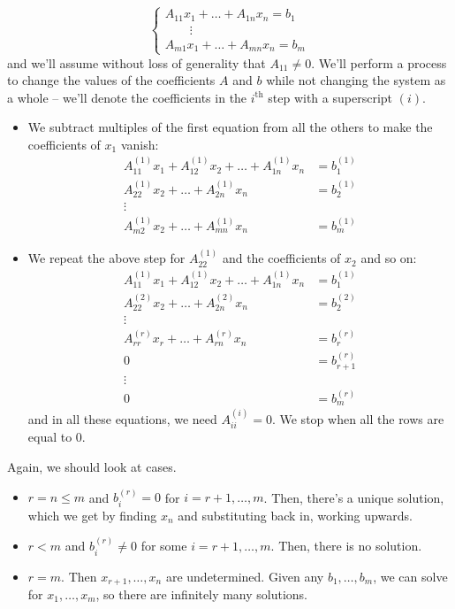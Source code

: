 \documentclass{../template/note}
\begin{document}
    \[
        \begin{cases}
            A_{11}x_1 + \dots + A_{1n}x_n = b_1 \\
            \qquad \vdots \\
            A_{m1}x_1 + \dots + A_{mn}x_n = b_m
        \end{cases}
    \]
    and we'll assume without loss of generality that \(A_{11} \neq 0\). We'll perform a process to change the values of the coefficients \(A\) and \(b\) while not changing the system as a whole -- we'll denote the coefficients in the \(i^\text{th}\) step with a superscript \((i)\).
    \begin{itemize}
        \item We subtract multiples of the first equation from all the others to make the coefficients of \(x_1\) vanish:
        \begin{align*}
            A_{11}^{(1)}x_1 + A_{12}^{(1)}x_2 + \dots + A_{1n}^{(1)}x_n &= b_1^{(1)} \\
            A_{22}^{(1)}x_2 + \dots + A_{2n}^{(1)}x_n &= b_2^{(1)} \\
            \vdots \\
            A_{m2}^{(1)}x_2 + \dots + A_{mn}^{(1)}x_n &= b_m^{(1)}
        \end{align*}
        \item We repeat the above step for \(A_{22}^{(1)}\) and the coefficients of \(x_2\) and so on:
        \begin{align*}
            A_{11}^{(1)}x_1 + A_{12}^{(1)}x_2 + \dots + A_{1n}^{(1)}x_n &= b_1^{(1)} \\
            A_{22}^{(2)}x_2 + \dots + A_{2n}^{(2)}x_n &= b_2^{(2)} \\ 
            \vdots \\
            A_{rr}^{(r)}x_r + \dots + A_{rn}^{(r)}x_n &= b_r^{(r)} \\
            0 &= b_{r+1}^{(r)} \\
            \vdots \\
            0 &= b_m^{(r)}
        \end{align*}
        and in all these equations, we need \(A_{ii}^{(i)} = 0\). We stop when all the rows are equal to 0.
    \end{itemize}
    Again, we should look at cases.
    \begin{itemize}
        \item \(r = n \leq m\) and \(b_i^{(r)} = 0\) for \(i = r+1, \dots, m\). Then, there's a unique solution, which we get by finding \(x_n\) and substituting back in, working upwards.
        \item \(r < m\) and \(b_i^{(r)} \neq 0\) for some \(i = r+1, \dots, m\). Then, there is no solution.
        \item \(r = m\). Then \(x_{r+1}, \dots, x_n\) are undetermined. Given any \(b_1, \dots, b_m\), we can solve for \(x_1, \dots, x_m\), so there are infinitely many solutions. 
    \end{itemize}
\end{document}
